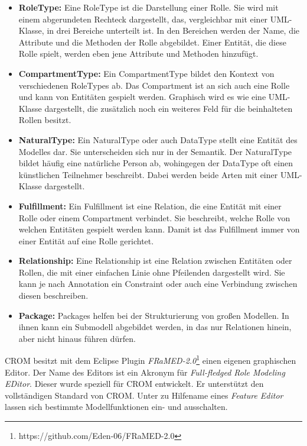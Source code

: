 \begin{itemize}
    \item \textbf{RoleType:}
    Eine RoleType ist die Darstellung einer Rolle.
    Sie wird mit einem abgerundeten Rechteck dargestellt, das, vergleichbar mit einer UML-Klasse, in drei Bereiche unterteilt ist.
    In den Bereichen werden der Name, die Attribute und die Methoden der Rolle abgebildet.
    Einer Entität, die diese Rolle spielt, werden eben jene Attribute und Methoden hinzufügt.
    \item \textbf{CompartmentType:}
    Ein CompartmentType bildet den Kontext von verschiedenen RoleTypes ab.
    Das Compartment ist an sich auch eine Rolle und kann von Entitäten gespielt werden.
    Graphisch wird es wie eine UML-Klasse dargestellt, die zusätzlich noch ein weiteres Feld für die beinhalteten Rollen besitzt.
    \item \textbf{NaturalType:}
    Ein NaturalType oder auch DataType stellt eine Entität des Modelles dar.
    Sie unterscheiden sich nur in der Semantik.
    Der NaturalType bildet häufig eine natürliche Person ab, wohingegen der DataType oft einen künstlichen Teilnehmer beschreibt.
    Dabei werden beide Arten mit einer UML-Klasse dargestellt. 
    \item \textbf{Fulfillment:}
    Ein Fulfillment ist eine Relation, die eine Entität mit einer Rolle oder einem Compartment verbindet.
    Sie beschreibt, welche Rolle von welchen Entitäten gespielt werden kann.
    Damit ist das Fulfillment immer von einer Entität auf eine Rolle gerichtet.
    \item \textbf{Relationship:}
    Eine Relationship ist eine Relation zwischen Entitäten oder Rollen, die mit einer einfachen Linie ohne Pfeilenden dargestellt wird.
    Sie kann je nach Annotation ein Constraint oder auch eine Verbindung zwischen diesen beschreiben.
    \item \textbf{Package:}
    Packages helfen bei der Strukturierung von großen Modellen.
    In ihnen kann ein Submodell abgebildet werden, in das nur Relationen hinein, aber nicht hinaus führen dürfen.
\end{itemize}

CROM besitzt mit dem Eclipse Plugin \emph{FRaMED-2.0}\footnote{https://github.com/Eden-06/FRaMED-2.0} einen eigenen graphischen Editor.
Der Name des Editors ist ein Akronym für \emph{Full-fledged Role Modeling EDitor}. 
Dieser wurde speziell für CROM entwickelt.
Er unterstützt den vollständigen Standard von CROM.
Unter zu Hilfename eines \emph{Feature Editor} lassen sich bestimmte Modellfunktionen ein- und ausschalten.

